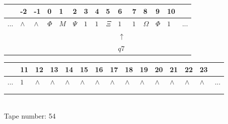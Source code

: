 \documentclass[11pt]{article}
\begin{document}
\begin{table}[H]
\centering
\begin{tabular}{lllllllllllllll}
 & -2 & -1 & 0 & 1 & 2 & 3 & 4 & 5 & 6 & 7 & 8 & 9 & 10 & \\
\hline
$...$ & \multicolumn{1}{|l|}{$\wedge$} & \multicolumn{1}{|l|}{$\wedge$} & \multicolumn{1}{|l|}{$\Phi$} & \multicolumn{1}{|l|}{$M$} & \multicolumn{1}{|l|}{$\Psi$} & \multicolumn{1}{|l|}{$1$} & \multicolumn{1}{|l|}{$1$} & \multicolumn{1}{|l|}{$\Xi$} & \multicolumn{1}{|l|}{$1$} & \multicolumn{1}{|l|}{$1$} & \multicolumn{1}{|l|}{$\Omega$} & \multicolumn{1}{|l|}{$\Phi$} & \multicolumn{1}{|l|}{$1$} & $...$\\
\hline
&  &  &  &  &  &  &  &  & $\uparrow$ &  &  &  &  &  \\
&  &  &  &  &  &  &  &  & $ q7 $ &  &  &  &  &  \\
\end{tabular}
\begin{tabular}{lllllllllllllll}
 & 11 & 12 & 13 & 14 & 15 & 16 & 17 & 18 & 19 & 20 & 21 & 22 & 23 & \\
\hline
$...$ & \multicolumn{1}{|l|}{$1$} & \multicolumn{1}{|l|}{$\wedge$} & \multicolumn{1}{|l|}{$\wedge$} & \multicolumn{1}{|l|}{$\wedge$} & \multicolumn{1}{|l|}{$\wedge$} & \multicolumn{1}{|l|}{$\wedge$} & \multicolumn{1}{|l|}{$\wedge$} & \multicolumn{1}{|l|}{$\wedge$} & \multicolumn{1}{|l|}{$\wedge$} & \multicolumn{1}{|l|}{$\wedge$} & \multicolumn{1}{|l|}{$\wedge$} & \multicolumn{1}{|l|}{$\wedge$} & \multicolumn{1}{|l|}{$\wedge$} & $...$\\
\hline
&  &  &  &  &  &  &  &  &  &  &  &  &  &  \\
&  &  &  &  &  &  &  &  &  &  &  &  &  &  \\
\end{tabular}
\\
Tape number: 54
\noindent\makebox[\linewidth]{\hdashrule{\textwidth}{1pt}{1pt}}\end{table}
\end{document}
